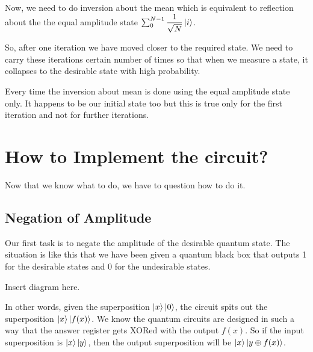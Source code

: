 \documentclass[a4paper]{article}
\begin{document}
Now, we need to do inversion about the mean which is equivalent to reflection about the the equal amplitude state $\sum_{0}^{N - 1} \dfrac{1}{\sqrt{N}} \ket{i}$.


So, after one iteration we have moved closer to the required state. We need to carry these iterations certain number of times so that when we measure a state, it collapses to the desirable state with high probability.

Every time the inversion about mean is done using the equal amplitude state only. It happens to be our initial state too but this is true only for the first iteration and not for further iterations.

\section{How to Implement the circuit?}

Now that we know what to do, we have to question how to do it.
\subsection{Negation of Amplitude}
Our first task is to negate the amplitude of the desirable quantum state.
The situation is like this that we have been given a quantum black box that outputs 1 for the desirable states and 0 for the undesirable states.

Insert diagram here.

In other words, given the superposition $\ket{x}\ket{0}$, the circuit spits out the superposition $\ket{x}\ket{f(x)}$. We know the quantum circuits are designed in such a way that the answer register gets XORed with the output $f(x)$. So if the input superposition is $\ket{x}\ket{y}$, then the output superposition will be $\ket{x}\ket{y \oplus{f(x)}}$.
\end{document}
